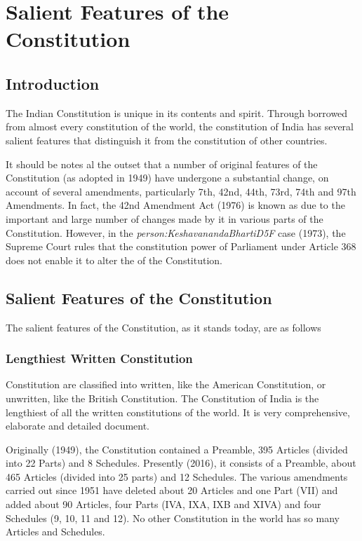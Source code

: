 \theendnotes
\cleardoublepage
\twocolumn

\chapter{Salient Features of the Constitution}

\section{Introduction}

The Indian Constitution is unique in its contents and spirit. Through borrowed from almost every constitution of the world, the constitution of India has several salient features that distinguish it from the constitution of other countries.

It should be notes al the outset that a number of original features of the Constitution (as adopted in 1949) have undergone a substantial change, on account of several amendments, particularly 7th, 42nd, 44th, 73rd, 74th and 97th Amendments. In fact, the 42nd Amendment Act (1976) is known as  due to the important and large number of changes made by it in various parts of the Constitution. However, in the { \textit{\gls{person:KeshavanandaBhartiD5F}}} case (1973), the Supreme Court rules that the constitution power of Parliament under Article 368 does not enable it to alter the  of the Constitution.

\section{Salient Features of the Constitution}

The salient features of the Constitution, as it stands today, are as follows

\subsection{Lengthiest Written Constitution}

Constitution are classified into written, like the American Constitution, or unwritten, like the British Constitution. The Constitution of India is the lengthiest of all the written constitutions of the world. It is very comprehensive, elaborate and detailed document.

Originally (1949), the Constitution contained a Preamble, 395 Articles (divided into 22 Parts) and 8 Schedules. Presently (2016), it consists of a Preamble, about 465 Articles (divided into 25 parts) and 12 Schedules. The various amendments carried out since 1951 have deleted about 20 Articles and one Part (VII) and added about 90 Articles, four Parts (IVA, IXA, IXB and XIVA) and four Schedules (9, 10, 11 and 12). No other Constitution in the world has so many Articles and Schedules.

